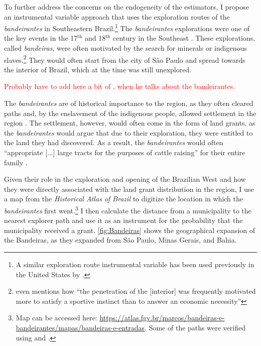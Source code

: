 \documentclass[11pt]{article}
\newcommand{\red}[1]{\textcolor{red}{#1}}
\begin{document}
To further address the concerns on the endogeneity of the estimators, I propose an instrumental variable approach that uses the exploration routes of the \textit{bandeirantes} in Southeastern Brazil.\footnote{A similar exploration route instrumental variable has been used previously in the United States by \textcite{Duranton2011-rv}.}
The \textit{bandeirantes} explorations were one of the key events in the 17$^{\text{th}}$ and 18$^\text{th}$ century in the Southeast \parencite[p.~46-47]{Fausto2014-bh}. 
These explorations, called \textit{bandeiras}, were often motivated by the search for minerals or indigenous slaves.\footnote{\textcite[p.~142]{Morse1965-kw} even mentions how ``the penetration of the [interior] was frequently motivated more to satisfy a sportive instinct than to answer an economic necessity''}
They would often start from the city of São Paulo and spread towards the interior of Brazil, which at the time was still unexplored.

\red{Probably have to add here a bit of \textcite{Azevedo1944-gs}, when he talks about the bandeirantes.}

The \textit{bandeirantes} are of historical importance to the region, as they often cleared paths and, by the enslavement of the indigenous people, allowed settlement in the region \parencite[p.~320]{Smith1972-dv}.
The settlement, however, would often come in the form of land grants, as the \textit{bandeirantes} would argue that due to their exploration, they were entitled to the land they had discovered. 
As a result, the \textit{bandeirantes} would often ``appropriate [...] large tracts for the purposes of cattle raising'' for their entire family \parencite[p.~320]{Smith1972-dv}.

Given their role in the exploration and opening of the Brazilian West and how they were directly associated with the land grant distribution in the region, I use a map from the \textit{Historical Atlas of Brazil} to digitize the location in which the \textit{bandeirantes} first went.\footnote{Map can be accessed here: \url{https://atlas.fgv.br/marcos/bandeiras-e-bandeirantes/mapas/bandeiras-e-entradas}. Some of the paths were verified using \textcite{Santos2022-rv} and \textcite{Cortesao1958-hm}.}
I then calculate the distance from a municipality to the nearest explorer path and use it as an instrument for the probability that the municipality received a grant. \autoref{fig:Bandeiras} shows the geographical expansion of the Bandeiras, as they expanded from São Paulo, Minas Gerais, and Bahia.
\end{document}
